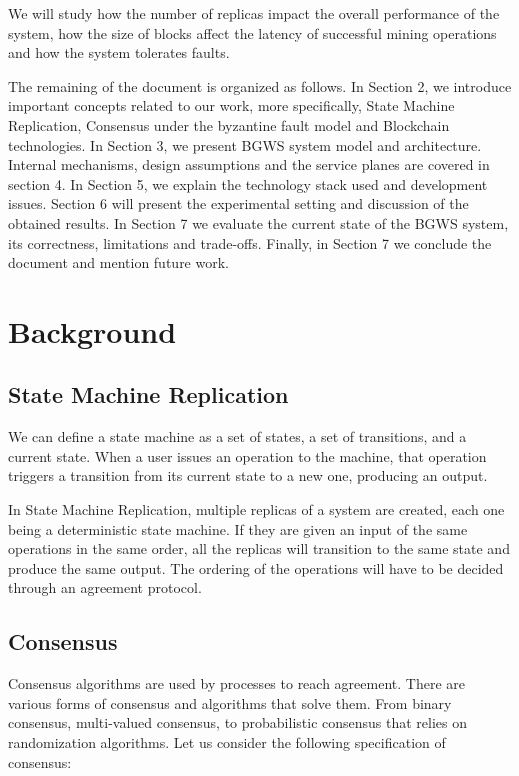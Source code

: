 \documentclass[10pt,journal,compsoc]{IEEEtran}
\begin{document}
	We will study how the number of replicas impact the overall performance of the system, how the size of blocks affect the latency of successful mining operations and how the system tolerates faults.
		
	The remaining of the document is organized as follows.
	In Section 2, we introduce important concepts related to our work, more specifically, State Machine Replication, Consensus under the byzantine fault model and Blockchain technologies.
	In Section 3, we present BGWS system model and architecture.
	Internal mechanisms, design assumptions and the service planes are covered in section 4.
	In Section 5, we explain the technology stack used and development issues.
	Section 6 will present the experimental setting and discussion of the obtained results.
	In Section 7 we evaluate the current state of the BGWS system, its correctness, limitations and trade-offs.
	Finally, in Section 7 we conclude the document and mention future work.
	

	\section{Background}
	\subsection{State Machine Replication}
	We can define a state machine as a set of states, a set of transitions, and a current state. When a user issues an operation to the machine, that operation triggers a transition from its current state to a new one, producing an output. 

	In State Machine Replication, multiple replicas of a system are created, each one being a deterministic state machine. If they are given an input of the same operations in the same order, all the replicas will transition to the same state and produce the same output. The ordering of the operations will have to be decided through an agreement protocol. 

	\subsection{Consensus}
	Consensus algorithms are used by processes to reach agreement. There are various forms of consensus and algorithms that solve them\cite{lamport2001paxos}\cite{raft}. From binary consensus, multi-valued consensus, to probabilistic consensus that relies on randomization algorithms\cite{moniz2008ritas}\cite{moniz2006experimental}. Let us consider the following specification of consensus: 
\end{document}
